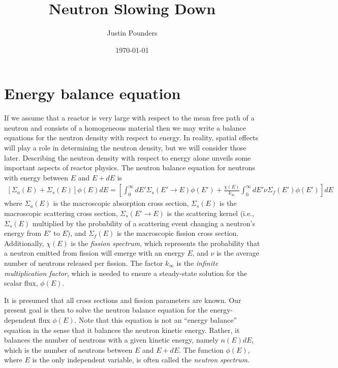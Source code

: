 \documentclass[11pt]{article}
\author{Justin Pounders}
\date{\today}
\title{Neutron Slowing Down}
\begin{document}
\maketitle
\tableofcontents

\section{Energy balance equation}
\label{sec:orgheadline1}
If we assume that a reactor is very large with respect to the mean free path of a neutron and consists of a homogeneous material then we may write a balance equations for the neutron density with respect to energy.  In reality, spatial effects will play a role in determining the neutron density, but we will consider those later.  Describing the neutron density with respect to energy alone unveils some important aspects of reactor physics.  The neutron balance equation for neutrons with energy between \(E\) and \(E+dE\) is
\begin{align}
  \left[ \Sigma_a(E) + \Sigma_s(E) \right] \phi(E) dE
  = \left[ \int_0^\infty dE' \Sigma_s(E' \rightarrow E ) \phi(E')
           + \frac{\chi(E)}{k_\infty} \int_0^\infty dE' \nu\Sigma_f(E') \phi(E') \right] dE
\end{align}
where \(\Sigma_a(E)\) is the macroscopic absorption cross section, \(\Sigma_s(E)\) is the macroscopic scattering cross section, \(\Sigma_s(E' \rightarrow E)\) is the scattering kernel (i.e., \(\Sigma_s(E)\) multiplied by the probability of a scattering event changing a neutron's energy from \(E'\) to \(E\)), and \(\Sigma_f(E)\) is the macroscopic fission cross section.  Additionally, \(\chi(E)\) is the \emph{fission spectrum}, which represents the probability that a neutron emitted from fission will emerge with an energy \(E\), and \(\nu\) is the average number of neutrons released per fission.  The factor \(k_\infty\) is the \emph{infinite multiplication factor}, which is needed to ensure a steady-state solution for the scalar flux, \(\phi(E)\).

It is presumed that all cross sections and fission parameters are known.  Our present goal is then to solve the neutron balance equation for the energy-dependent flux \(\phi(E)\).  Note that this equation is not an ``energy balance'' equation in the sense that it balances the neutron kinetic energy.  Rather, it balances the number of neutrons with a given kinetic energy, namely \(n(E)dE\), which is the number of neutrons between \(E\) and \(E+dE\).  The function \(\phi(E)\), where \(E\) is the only independent variable, is often called the \emph{neutron spectrum}.
\end{document}
